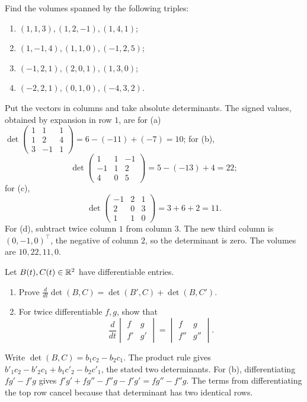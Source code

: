 \begin{problem}\label{ex:07:volume}
Find the volumes spanned by the following triples:
\begin{enumerate}
\item \((1,1,3),(1,2,-1),(1,4,1)\);
\item \((1,-1,4),(1,1,0),(-1,2,5)\);
\item \((-1,2,1),(2,0,1),(1,3,0)\);
\item \((-2,2,1),(0,1,0),(-4,3,2)\).
\end{enumerate}
\end{problem}
\begin{solution}
Put the vectors in columns and take absolute determinants. The signed values, obtained by expansion in row \(1\), are
for (a)
\(\det\begin{pmatrix}1&1&1\\1&2&4\\3&-1&1\end{pmatrix}
=6-(-11)+(-7)=10\);
for (b),
\[
 \det\begin{pmatrix}1&1&-1\\-1&1&2\\4&0&5\end{pmatrix}
 =5-(-13)+4=22;
\]
for (c),
\[
 \det\begin{pmatrix}-1&2&1\\2&0&3\\1&1&0\end{pmatrix}
 =3+6+2=11.
\]
For (d), subtract twice column \(1\) from column \(3\).
The new third column is \((0,-1,0)^\top\), the negative of column \(2\),
so the determinant is zero. The volumes are \(10,22,11,0\).
\end{solution}

\begin{problem}\label{ex:07:derivative}
Let \(B(t),C(t)\in\mathbb R^2\) have differentiable entries.
\begin{enumerate}
\item Prove \(\frac{d}{dt}\det(B,C)=\det(B',C)+\det(B,C')\).
\item For twice differentiable \(f,g\), show that
\[
 \frac{d}{dt}\begin{vmatrix}f&g\\f'&g'\end{vmatrix}
 =\begin{vmatrix}f&g\\f''&g''\end{vmatrix}.
\]
\end{enumerate}
\end{problem}
\begin{solution}
Write \(\det(B,C)=b_1c_2-b_2c_1\). The product rule gives
\(b'_1c_2-b'_2c_1+b_1c'_2-b_2c'_1\), the stated two determinants.
For (b), differentiating \(fg'-f'g\) gives
\(f'g'+fg''-f''g-f'g'=fg''-f''g\).
The terms from differentiating the top row cancel because that
determinant has two identical rows.
\end{solution}

